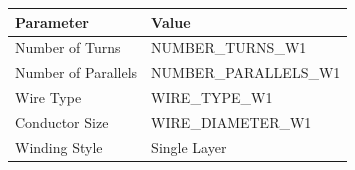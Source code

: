 \documentclass[10pt,a4paper]{article}
\begin{document}
\begin{minipage}[t]{0.52\textwidth}
\vspace{4mm}

\noindent{\large\bfseries\textcolor{headerblue}{Winding Construction}}
\vspace{2mm}

{\footnotesize
\begin{tabular}{|l|l|}
\hline
\rowcolor{lightblue}
\textbf{Parameter} & \textbf{Value} \\
\hline
Number of Turns & {{NUMBER_TURNS_W1}} \\
\hline
Number of Parallels & {{NUMBER_PARALLELS_W1}} \\
\hline
Wire Type & {{WIRE_TYPE_W1}} \\
\hline
Conductor Size & {{WIRE_DIAMETER_W1}} \\
\hline
Winding Style & Single Layer \\
\hline
\end{tabular}
}

\end{minipage}
\hfill
\end{document}
